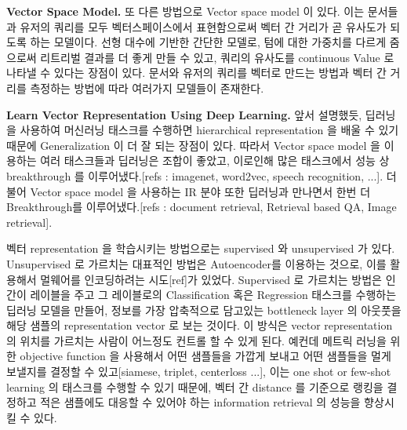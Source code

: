 \textbf{Vector Space Model.} 또 다른 방법으로 Vector space model 이 있다. 이는 문서들과 유저의 쿼리를 모두 벡터스페이스에서 표현함으로써 벡터 간 거리가 곧 유사도가 되도록 하는 모델이다. 선형 대수에 기반한 간단한 모델로, 텀에 대한 가중치를 다르게 줌으로써 리트리벌 결과를 더 좋게 만들 수 있고, 쿼리의 유사도를 continuous Value 로 나타낼 수 있다는 장점이 있다.\cite{salton1975vector} 문서와 유저의 쿼리를 벡터로 만드는 방법\cite{}과 벡터 간 거리를 측정하는 방법\cite{}에 따라 여러가지 모델들이 존재한다.







\textbf{Learn Vector Representation Using Deep Learning.} 앞서 설명했듯, 딥러닝을 사용하여 머신러닝 태스크를 수행하면 hierarchical representation 을 배울 수 있기 때문에 Generalization 이 더 잘 되는 장점이 있다. 따라서 Vector space model 을 이용하는 여러 태스크들과 딥러닝은 조합이 좋았고, 이로인해 많은 태스크에서 성능 상 breakthrough 를 이루어냈다.[refs : imagenet, word2vec, speech recognition, ...]. 더불어 Vector space model 을 사용하는 IR 분야 또한 딥러닝과 만나면서 한번 더 Breakthrough를 이루어냈다.[refs : document retrieval, Retrieval based QA, Image retrieval]. 

벡터 representation 을 학습시키는 방법으로는 supervised 와 unsupervised 가 있다. Unsupervised 로 가르치는 대표적인 방법은 Autoencoder를 이용하는 것으로, 이를 활용해서 멀웨어를 인코딩하려는 시도[ref]가 있었다. Supervised 로 가르치는 방법은 인간이 레이블을 주고 그 레이블로의 Classification 혹은 Regression 태스크를 수행하는 딥러닝 모델을 만들어, 정보를 가장 압축적으로 담고있는 bottleneck layer 의 아웃풋을 해당 샘플의 representation vector 로 보는 것이다. 이 방식은 vector representation 의 위치를 가르치는 사람이 어느정도 컨트롤 할 수 있게 된다. 예컨데 메트릭 러닝을 위한 objective function 을 사용해서 어떤 샘플들을 가깝게 보내고 어떤 샘플들을 멀게 보낼지를 결정할 수 있고[siamese, triplet, centerloss ...], 이는 one shot or few-shot learning 의 태스크를 수행할 수 있기 때문에, 벡터 간 distance 를 기준으로 랭킹을 결정하고 적은 샘플에도 대응할 수 있어야 하는 information retrieval 의 성능을 향상시킬 수 있다. 



